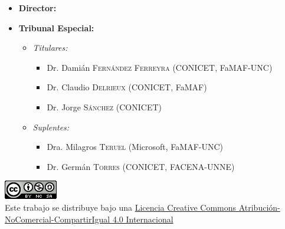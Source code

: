 \documentclass[
11pt, %
spanish, %
singlespacing, %
toctotoc, %
headsepline, %
chapterinoneline, %
]{MastersDoctoralThesis} %
\begin{document}
\begin{titlepage}
\begin{center}
    \begin{itemize}[label={}]
        \item \textbf{Director:} {\normalsize \supname}
        \item \textbf{Tribunal Especial:}
        \normalsize
        \begin{itemize}[label={}]
            \item \emph{Titulares:}
            \begin{itemize}[label={}]
                \item Dr. Damián \textsc{Fernández Ferreyra} (CONICET, FaMAF-UNC)
                \item Dr. Claudio \textsc{Delrieux} (CONICET, FaMAF)
                \item Dr. Jorge \textsc{Sánchez} (CONICET)
            \end{itemize}
            \item \emph{Suplentes:}
            \begin{itemize}[label={}]
                \item Dra. Milagros \textsc{Teruel} (Microsoft, FaMAF-UNC)
                \item Dr. Germán \textsc{Torres} (CONICET, FACENA-UNNE)
            \end{itemize}
        \end{itemize}
    \end{itemize}
    \vspace{1cm}

    \includegraphics{logo_cc_by_nc_sa.png} \\

    \small
    Este trabajo se distribuye bajo una \href{http://creativecommons.org/licenses/by-nc-sa/4.0/}{Licencia Creative Commons Atribución-NoComercial-CompartirIgual 4.0 Internacional}

\end{center}
\end{titlepage}

\end{document}
